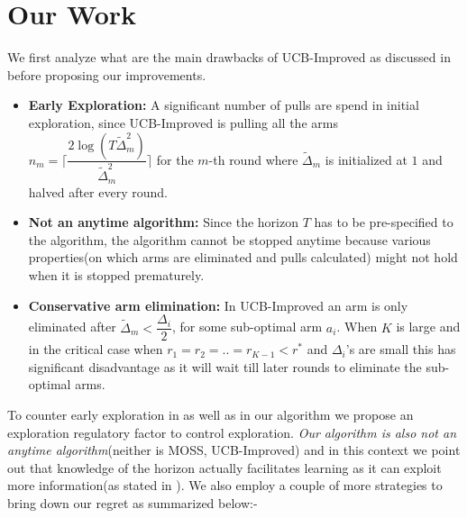 \section*{Our Work}

	We first analyze what are the main drawbacks of UCB-Improved as discussed in \cite{liu2016modification} before proposing our improvements. 
	
\begin{itemize}
\item \textbf{Early Exploration:} A significant number of pulls are spend in initial exploration, since UCB-Improved is pulling all the arms $n_{m}=\bigg\lceil \dfrac{ 2\log(T\tilde{\Delta}^{2}_{m})}{\tilde{\Delta}^{2}_{m}} \bigg\rceil$ for the $m$-th round where $\tilde{\Delta}_{m}$ is initialized at $1$ and halved after every round.
\item \textbf{Not an anytime algorithm:} Since the horizon $T$ has to be pre-specified to the algorithm, the algorithm cannot be stopped anytime because various properties(on which arms are eliminated and pulls calculated) might not hold when it is stopped prematurely.
\item \textbf{Conservative arm elimination:} In UCB-Improved an arm is only eliminated after $\tilde{\Delta}_{m}<\dfrac{\Delta_{i}}{2}$, for some sub-optimal arm $a_{i}$. When $K$ is large and in the critical case when $r_{1}=r_{2}=..=r_{K-1}<r^{*}$ and $\Delta_{i}$'s are small this has significant disadvantage as it will wait till later rounds to eliminate the sub-optimal arms.
\end{itemize}
	To counter early exploration in \cite{liu2016modification} as well as in our algorithm we propose an exploration regulatory factor to control exploration. \textit{Our algorithm is also not an anytime algorithm}(neither is MOSS, UCB-Improved) and in this context we point out that knowledge of the horizon actually facilitates learning as it can exploit more information(as stated in \cite{lattimore2015optimally}). We also employ a couple of more strategies to bring down our regret as summarized below:-
	

